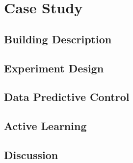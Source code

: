 \section{Case Study}


\subsection{Building Description}

\subsection{Experiment Design}

\subsection{Data Predictive Control}

\subsection{Active Learning}

\subsection{Discussion}

